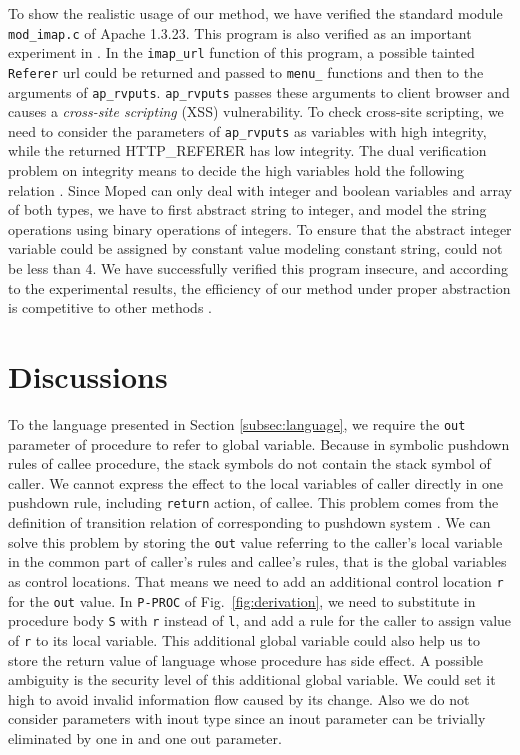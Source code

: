 \documentclass{llncs}
\begin{document}
To show the realistic usage of our method, we have verified the
standard module \texttt{mod\_imap.c} of Apache 1.3.23. This program
is also verified as an important experiment in
\cite{DBLP:conf/pldi/UnnoKY06}. In the \texttt{imap\_url} function
of this program, a possible tainted \texttt{Referer} url could be
returned and passed to \texttt{menu\_} functions and then to
the arguments of \texttt{ap\_rvputs}. \texttt{ap\_rvputs} passes
these arguments to client browser and causes a \emph{cross-site
scripting} (XSS) vulnerability. To check cross-site scripting, we
need to consider the parameters of \texttt{ap\_rvputs} as variables
with \textsf{high} integrity, while the returned HTTP\_REFERER has
\textsf{low} integrity. The dual verification problem on integrity
means to decide the \textsf{high} variables hold the following
relation . Since
Moped can only deal with integer and boolean variables and array of
both types, we have to first abstract string to integer, and model
the string operations using binary operations of integers. To ensure
that the abstract integer variable could be assigned by constant
value modeling constant string,  could not be less than 4. We
have successfully verified this program insecure, and according to
the experimental results, the efficiency of our method under proper
abstraction is competitive to other methods
\cite{DBLP:conf/pldi/UnnoKY06}.

\section{\label{sec:discuss}Discussions}
To the language presented in Section \ref{subsec:language}, we
require the \texttt{out} parameter of procedure to refer to global
variable. Because in symbolic pushdown rules of callee procedure,
the stack symbols do not contain the stack symbol of caller. We
cannot express the effect to the local variables of caller directly
in one pushdown rule, including \texttt{return} action, of callee.
This problem comes from the definition of transition relation
 of  corresponding
to pushdown system . We can solve this problem by
storing the \texttt{out} value referring to the caller's local
variable in the common part of caller's rules and callee's rules,
that is the global variables as control locations. That means we
need to add an additional control location \texttt{r} for the
\texttt{out} value. In \texttt{P-PROC} of Fig.~\ref{fig:derivation},
we need to substitute \texttt{} in procedure body \texttt{S}
with \texttt{r} instead of \texttt{l}, and add a rule for the caller
to assign value of \texttt{r} to its local variable. This additional
global variable could also help us to store the return value of
language whose procedure has side effect. A possible ambiguity is
the security level of this additional global variable. We could set
it \textsf{high} to avoid invalid information flow caused by its
change. Also we do not consider parameters with \textsf{inout} type
since an \textsf{inout} parameter can be trivially eliminated by one
\textsf{in} and one \textsf{out} parameter.
\end{document}
